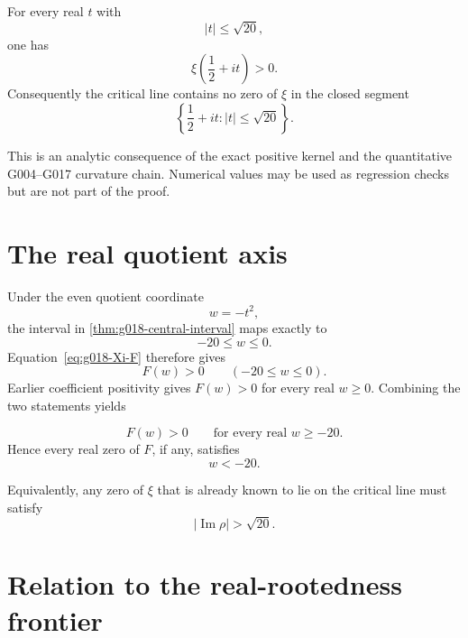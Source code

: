 \begin{theorem}
\label{thm:g018-central-interval}
For every real $t$ with
\[
 |t|\le\sqrt{20},
\]
one has
\begin{equation}
 \boxed{
 \xi\!\left(\frac12+it\right)>0.
 }
 \label{eq:g018-critical-positive}
\end{equation}
Consequently the critical line contains no zero of $\xi$ in the closed segment
\[
 \left\{\frac12+it:|t|\le\sqrt{20}\right\}.
\]
\end{theorem}

This is an analytic consequence of the exact positive kernel and the
quantitative G004--G017 curvature chain.  Numerical values may be used as
regression checks but are not part of the proof.

\section{The real quotient axis}

Under the even quotient coordinate
\[
 w=-t^2,
\]
the interval in \cref{thm:g018-central-interval} maps exactly to
\[
 -20\le w\le0.
\]
Equation~\eqref{eq:g018-Xi-F} therefore gives
\begin{equation}
 \boxed{F(w)>0\qquad(-20\le w\le0).}
 \label{eq:g018-F-negative-interval}
\end{equation}
Earlier coefficient positivity gives $F(w)>0$ for every real $w\ge0$.
Combining the two statements yields
\begin{corollary}
\label{cor:g018-real-axis}
\begin{equation}
 \boxed{F(w)>0\qquad\text{for every real }w\ge-20.}
 \label{eq:g018-F-halfline}
\end{equation}
Hence every real zero of $F$, if any, satisfies
\begin{equation}
 \boxed{w<-20.}
 \label{eq:g018-real-root-location}
\end{equation}
\end{corollary}

Equivalently, any zero of $\xi$ that is already known to lie on the critical
line must satisfy
\begin{equation}
 \boxed{|\operatorname{Im}\rho|>\sqrt{20}.}
 \label{eq:g018-critical-zero-height}
\end{equation}

\section{Relation to the real-rootedness frontier}

